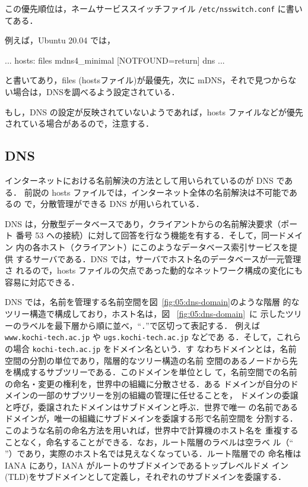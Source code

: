この優先順位は，ネームサービススイッチファイル \texttt{/etc/nsswitch.conf}  に書いてある．

例えば，Ubuntu 20.04 では，
\begin{cli}
...
hosts:          files mdns4_minimal [NOTFOUND=return] dns
...
\end{cli}
と書いてあり，files (hostsファイル)が最優先，次に mDNS，それで見つからない場合は，DNSを調べるよう設定されている．

もし，DNS の設定が反映されていないようであれば，hosts ファイルなどが優先されている場合があるので，注意する．

\subsection*{DNS}
インターネットにおける名前解決の方法として用いられているのが DNS である．
前説の hosts ファイルでは，インターネット全体の名前解決は不可能であるの
で，分散管理ができる DNS が用いられている．

DNS は，分散型データベースであり，クライアントからの名前解決要求（ポート
番号 53 への接続）に対して回答を行なう機能を有する．そして，同一ドメイン
内の各ホスト（クライアント）にこのようなデータベース索引サービスを提供
するサーバである．DNS では，サーバでホスト名のデータベースが一元管理さ
れるので，hosts ファイルの欠点であった動的なネットワーク構成の変化にも
容易に対応できる．

DNS では，名前を管理する名前空間を図~\ref{fig:05:dns-domain}のような階層
的なツリー構造で構成しており，ホスト名は，図~ \ref{fig:05:dns-domain}~に
示したツリーのラベルを最下層から順に並べ，``\verb|.|''で区切って表記する．
例えば \verb|www.kochi-tech.ac.jp| や \verb|ugs.kochi-tech.ac.jp| などであ
る．そして，これらの場合 \verb|kochi-tech.ac.jp| をドメイン名という．す
なわちドメインとは，名前空間の分割の単位であり，階層的なツリー構造の名前
空間のあるノードから先を構成するサブツリーである．このドメインを単位とし
て，名前空間での名前の命名・変更の権利を，世界中の組織に分散させる．ある
ドメインが自分のドメインの一部のサブツリーを別の組織の管理に任せることを，
ドメインの委譲と呼び，委譲されたドメインはサブドメインと呼ぶ．世界で唯一
の名前であるドメインが，唯一の組織にサブドメインを委譲する形で名前空間を
分割する．このような名前の命名方法を用いれば，世界中で計算機のホスト名を
重複することなく，命名することができる．なお，ルート階層のラベルは空ラベ
ル（`` ''）であり，実際のホスト名では見えなくなっている．ルート階層での
命名権は IANA にあり，IANA がルートのサブドメインであるトップレベルドメ
イン(TLD)をサブドメインとして定義し，それぞれのサブドメインを委譲する．
   
